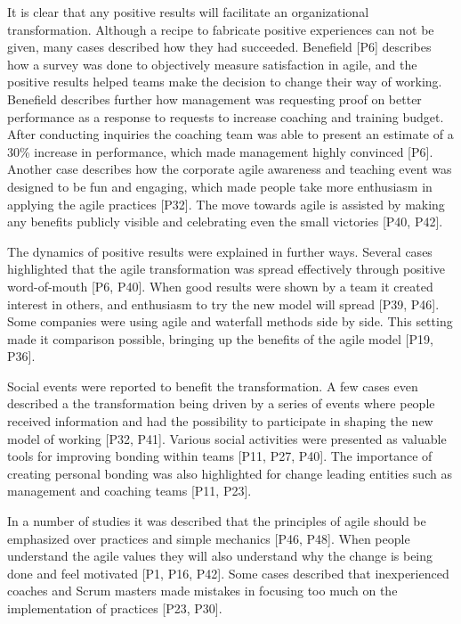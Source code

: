 It is clear that any positive results will facilitate an organizational
transformation. Although a recipe to fabricate positive experiences can not be
given, many cases described how they had succeeded. Benefield [P6] describes how
a survey was done to objectively measure satisfaction in agile, and the positive
results helped teams make the decision to change their way of working. Benefield
describes further how management was requesting proof on better performance as a
response to requests to increase coaching and training budget. After conducting
inquiries the coaching team was able to present an estimate of a 30\% increase
in performance, which made management highly convinced [P6]. Another case
describes how the corporate agile awareness and teaching event was designed to
be fun and engaging, which made people take more enthusiasm in applying the agile
practices [P32]. The move towards agile is assisted by making any benefits
publicly visible and celebrating even the small victories [P40, P42].

The dynamics of positive results were explained in further ways. Several cases
highlighted that the agile transformation was spread effectively through
positive word-of-mouth [P6, P40]. When good results were shown by a team it
created interest in others, and enthusiasm to try the new model will spread
[P39, P46]. Some companies were using agile and waterfall methods side by side.
This setting made it comparison possible, bringing up the benefits of the agile
model [P19, P36].


Social events were reported to benefit the transformation. A few cases even
described a the transformation being driven by a series of events where people
received information and had the possibility to participate in shaping the new
model of working [P32, P41]. Various social activities were presented as
valuable tools for improving bonding within teams [P11, P27, P40]. The importance of
creating personal bonding was also highlighted for change leading entities such
as management and coaching teams [P11, P23].


In a number of studies it was described that the principles of agile should be
emphasized over practices and simple mechanics [P46, P48]. When people
understand the agile values they will also understand why the change is being
done and feel motivated [P1, P16, P42].
Some cases described that inexperienced coaches and Scrum masters made mistakes
in focusing too much on the implementation of practices [P23, P30].

